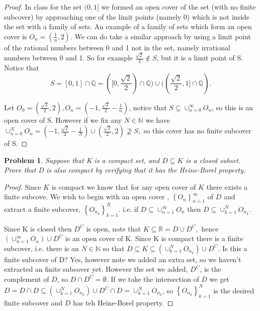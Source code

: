 \documentclass[11pt]{article}
\theoremstyle{plain}
\newtheorem{problem}{Problem}
\theoremstyle{remark}
\newcommand {\mbR} {\mathbb R}
\newcommand {\mbN} {\mathbb N}
\newcommand {\mbQ} {\mathbb Q}
\begin{document}
	\begin{proof}
		In class for the set $(0,1]$ we formed an open cover of the set (with no finite subcover) by approaching one of the limit points (namely 0) which is not inside the set with a family of sets. An example of a family of sets which form an open cover is $O_n=(\frac 1 n, 2)$. We can do take a similar approach by using a limit point of the rational numbers between 0 and 1 not in the set, namely irrational numbers between 0 and 1. So for example $\frac {\sqrt 2} 2\notin S$, but it is a limit point of S. Notice that \[S=[0,1]\cap \mbQ=([0,\frac {\sqrt 2} 2)\cap \mbQ)\cup ((\frac {\sqrt 2} 2,1]\cap \mbQ).\] 
		
		Let $O_0 = (\frac{\sqrt 2}{2}, 2),O_n=(-1,\frac{\sqrt2}{2}-\frac 1 n)$, notice that $S\subseteq \displaystyle \cup_{n=0}^\infty O_n$, so this is an open cover of S. However if we fix any $N\in \mbN$ we have $\cup_{n=0}^N O_n=(-1,\frac{\sqrt 2}{2}-\frac 1 N)\cup (\frac{\sqrt 2}{2},2)\not\supseteq S,$ so this cover has no finite subcover of S.
	\end{proof}
	\begin{problem}
	Suppose that K is a compact set, and $D\subseteq K$ is a closed subset. Prove that D is also compact by verifying that it has the Heine-Borel property.
	\end{problem}

	\begin{proof}
		Since $K$ is compact we know that for any open cover of $K$ there exists a finite subcove. We wish to begin with an open cover , $\left\{O_n\right\}_{n=1}^\infty$ of $D$ and extract a finite subcover, $\left\{O_{n_k}\right\}_{k=1}^N$. i.e. if $D\subseteq \cup_{n=1}^\infty O_n$ then $D\subseteq \cup_{k=1}^N O_{n_k}$. 
		
		Since K is closed then $D^C$ is open, note that $K\subseteq \mbR = D \cup D^C,$ hence $\left(\cup_{n=1}^\infty O_n\right)\cup D^C$ is an open cover of K. Since K is compact there is a finite subcover, i.e. there is an $N\in \mbN$ so that $D \subseteq K\subseteq \left(\cup_{k=1}^N O_{n_k}\right)\cup D^C$. Is this a finite subcover of D? Yes, however note we added an extra set, so we haven't extracted an finite subcover yet. However the set we added, $D^C$, is the complement of $D$, so $D\cap D^C = \emptyset.$ If we take the intersection of $D$ we get $D = D \cap D \subseteq \left(\cup_{k=1}^N O_{n_k}\right)\cup D^C\cap D = \cup_{k=1}^N O_{n_k}$, so $\left\{O_{n_k}\right\}_{k=1}^N$ is the desired finite subcover and $D$ has teh Heine-Borel property.
	\end{proof}
	
\end{document}

